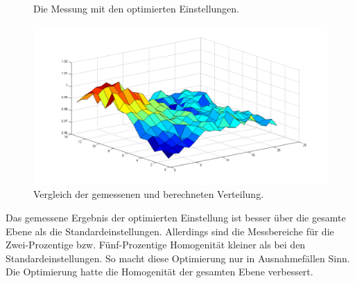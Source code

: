 \documentclass[a4paper,bibtotoc,oneside]{scrbook}
\begin{document}
\begin{figure} [htbp]
\caption{Die Messung mit den optimierten Einstellungen.}
\label{optm}
\end{figure} 

\begin{figure}[htbp]
\centering
\includegraphics[width=125mm]{img/vergleich_opt.png}
\caption{Vergleich der gemessenen und berechneten Verteilung.}\label{v26}
\end{figure}



Das gemessene Ergebnis der optimierten Einstellung ist besser über die gesamte Ebene als die Standardeinstellungen.
Allerdings sind die Messbereiche für die Zwei-Prozentige bzw. Fünf-Prozentige Homogenität kleiner als bei den Standardeinstellungen. So macht diese Optimierung nur in Ausnahmefällen Sinn. Die Optimierung hatte die Homogenität der gesamten Ebene verbessert.
\end{document}
